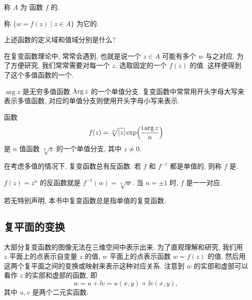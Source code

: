 \begin{definition}
  \begin{enuma}
    \item 称 $A$ 为 函数 $f$ 的.
    \item 称 $\{w=f(z)\mid z\in A\}$ 为它的.\footnotemark
  \end{enuma} 
\end{definition}

\begin{exercise}
  上述函数的定义域和值域分别是什么?
\end{exercise}

在复变函数理论中, 常常会遇到, 也就是说一个 $z\in A$ 可能有多个 $w$ 与之对应.
为了方便研究, 我们常常需要对每一个 $z$, 选取固定的一个 $f(z)$ 的值.
这样便得到了这个多值函数的一个.
\begin{exampleenum}
  \item $\arg z$ 是无穷多值函数 $\operatorname{Arg} z$ 的一个单值分支.
  复变函数中常常用开头字母大写来表示多值函数, 对应的单值分支则使用开头字母小写来表示.
  \item 函数
  \[
    f(z)=\sqrt[n]{\lvert z\rvert}\exp\Bigl(\frac{\mathrm{i}\arg z}n\Bigr)
  \]
  是 $n$ 值函数 $\sqrt[n]z$ 的一个单值分支, 其中 $z\neq 0$.
\end{exampleenum}

在考虑多值的情况下, 复变函数总有反函数.
若 $f$ 和 $f^{-1}$ 都是单值的, 则称 $f$ 是.

\begin{example}
  $f(z)=z^n$ 的反函数就是 $f^{-1}(w)=\sqrt[n]{w}$.
  {当 $n=\pm1$ 时, $f$ 是一一对应.}
\end{example}

若无特别声明, 本书中\alert{复变函数总是指单值的复变函数}.


\subsection{复平面的变换}

大部分复变函数的图像无法在三维空间中表示出来.
为了直观理解和研究, 我们用 $z$ 平面上的点表示自变量 $z$ 的值, $w$ 平面上的点表示函数 $w=f(z)$ 的值, 然后用这两个复平面之间的变换或映射来表示这种对应关系.
注意到 $w$ 的实部和虚部可以看作 $z$ 的实部和虚部的函数, 即
\[
  w=u+\ii v=u(x,y)+\ii v(x,y),
\]
其中 $u,v$ 是两个二元实函数.

